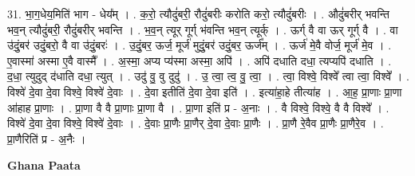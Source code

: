 \documentclass[17pt]{extarticle}
\begin{document}
31. भा॒ग॒धेय॒मिति॑ भाग - धेय᳚म् । . क॒रो॒ त्यौदुं॑बरी॒ रौदुं॑बरीः करोति करो॒ त्यौदुं॑बरीः । . औदुं॑बरीर् भवन्ति भव॒न् त्यौदुं॑बरी॒ रौदुं॑बरीर् भवन्ति । . भ॒व॒न् त्यूर् गूर्ग् भ॑वन्ति भव॒न् त्यूर्क् । . ऊर्ग् वै वा ऊर् गूर्ग् वै । . वा उ॑दुं॒बर॑ उदुं॒बरो॒ वै वा उ॑दुं॒बरः॑ । . उ॒दुं॒बर॒ ऊर्ज॒ मूर्ज॑ मुदुं॒बर॑ उदुं॒बर॒ ऊर्ज᳚म् । . ऊर्ज॑ मे॒वै वोर्ज॒ मूर्ज॑ मे॒व । . ए॒वास्मा॑ अस्मा ए॒वै वास्मै᳚ । . अ॒स्मा॒ अप्य प्य॑स्मा अस्मा॒ अपि॑ । . अपि॑ दधाति दधा॒ त्यप्यपि॑ दधाति । . द॒धा॒ त्युदुद् द॑धाति दधा॒ त्युत् । . उदु॑ वु॒ वु दुदु॑ । . उ॒ त्वा॒ त्व॒ वु॒ त्वा॒ । . त्वा॒ विश्वे॒ विश्वे᳚ त्वा त्वा॒ विश्वे᳚ । . विश्वे॑ दे॒वा दे॒वा विश्वे॒ विश्वे॑ दे॒वाः । . दे॒वा इतीति॑ दे॒वा दे॒वा इति॑ । . इत्या॑हा॒हे तीत्या॑ह । . आ॒ह॒ प्रा॒णाः प्रा॒णा आ॑हाह प्रा॒णाः । . प्रा॒णा वै वै प्रा॒णाः प्रा॒णा वै । . प्रा॒णा इति॑ प्र - अ॒नाः । . वै विश्वे॒ विश्वे॒ वै वै विश्वे᳚ । . विश्वे॑ दे॒वा दे॒वा विश्वे॒ विश्वे॑ दे॒वाः । . दे॒वाः प्रा॒णैः प्रा॒णैर् दे॒वा दे॒वाः प्रा॒णैः । . प्रा॒णै रे॒वैव प्रा॒णैः प्रा॒णैरे॒व । . प्रा॒णैरिति॑ प्र - अ॒नैः । \newline

\textbf{Ghana Paata } \newline
\end{document}
